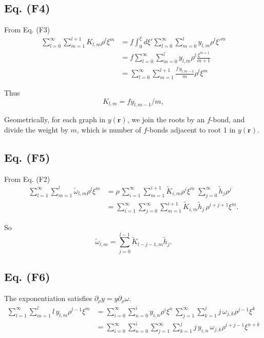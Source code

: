 \documentclass[aip,jcp,reprint,superscriptaddress]{revtex4-1}
\numberwithin{equation}{subsection}
\newcommand{\vct}[1]{\mathbf{#1}}
\providecommand{\vr}{} %
\renewcommand{\vr}{\vct{r}}
\begin{document}
\subsection{Eq. (F4)}

From Eq. (F3)
\begin{align*}
  \sum_{l=0}^\infty
  \sum_{m=1}^{l+1}
  K_{l,m} \rho^l \xi^m
&=
  f
  \int_0^\xi d\xi'
  \sum_{l=0}^\infty
  \sum_{m=0}^l
  y_{l,m} \rho^l {\xi'}^m
\\
&=
  f
  \sum_{l=0}^\infty
  \sum_{m=0}^l
  y_{l,m} \rho^l \frac{ \xi^{m+1} }{m+1}
\\
&=
  \sum_{l=0}^\infty
  \sum_{m=1}^{l+1}
  \frac{ f \, y_{l,m-1} }{m} \rho^l \xi^{m}
\end{align*}

Thus
\[
  K_{l,m} = f y_{l, m-1}/m,
\]


Geometrically, for each graph in $y(\vr)$,
we join the roots by an $f$-bond,
and divide the weight by $m$,
which is number of $f$-bonds adjacent to root 1
in $y(\vr)$.



\subsection{Eq. (F5)}

From Eq. (F2)
\begin{align*}
  \sum_{l=1}^\infty
  \sum_{m=1}^{l}
  \tilde\omega_{l,m} \rho^l \xi^m
&=
  \rho
  \,
  \sum_{i=1}^\infty
  \sum_{m=1}^{i+1}
  \tilde K_{i,m} \rho^i \xi^m
 \;
  \sum_{j=0}^\infty
  \tilde h_{j} \rho^j
\\
&=
  \sum_{i=1}^\infty
  \sum_{j=0}^\infty
  \sum_{m=1}^{i+1}
  \tilde K_{i,m}
  \tilde h_j
  \, \rho^{i+j+1} \xi^m.
\end{align*}

So
\[
  \tilde \omega_{l,m}
=
  \sum_{j = 0}^{l-1}
  \tilde K_{l - j - 1, m}
  \tilde h_{j}.
\]



\subsection{Eq. (F6)}

The exponentiation satisfies $\partial_\rho y = y \partial_\rho \omega$.
\begin{align*}
\sum_{l = 1}^\infty
\sum_{m = 1}^l
l \, y_{l, m} \rho^{l-1} \xi^m
&=
\sum_{i = 0}^\infty
\sum_{n = 0}^i
y_{i, n} \rho^{i} \xi^n
\,
\sum_{j = 1}^\infty
\sum_{k = 1}^j
j \, \omega_{j, k} \rho^{j-1} \xi^k
\\
&=
\sum_{i = 0}^\infty
\sum_{n = 0}^i
\sum_{j = 1}^\infty
\sum_{k = 1}^j
j \, y_{i, n} \,
\omega_{j, k} \rho^{i+j-1} \xi^{n+k}
\end{align*}
\end{document}
